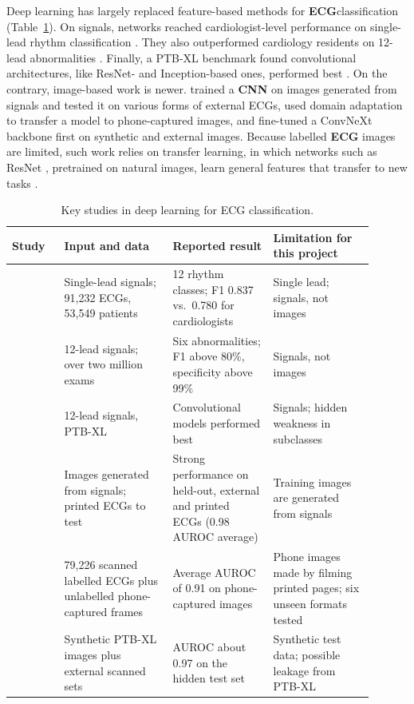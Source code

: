 Deep learning has largely replaced feature-based methods for \textbf{ECG}classification
(Table~\ref{tab:ecg-studies}). On signals, networks reached cardiologist-level performance on single-lead rhythm classification \cite{hannun_cardiologist_2019}. They also outperformed cardiology residents on 12-lead abnormalities \cite{ribeiro_automatic_2020}. Finally, a PTB-XL
benchmark found convolutional architectures, like ResNet- and Inception-based ones,
performed best \cite{strodthoff_deep_2021}. On the contrary, image-based work is newer.
\textcite{sangha_automated_2022} trained a \textbf{CNN} on images generated from signals
and tested it on various forms of external ECGs, \textcite{gliner_domain_2023} used
domain adaptation to transfer a model to phone-captured images, and
\textcite{wang_pipeline_2025} fine-tuned a ConvNeXt backbone first on synthetic and
external images. Because labelled \textbf{ECG} images are limited, such work relies on transfer
learning, in which networks such as ResNet \cite{he_deep_2016}, pretrained on natural
images, learn general features that transfer to new tasks
\cite{yosinski_transfer_2014}.

\begin{table}[ht]
  \centering
  \footnotesize
  \caption{Key studies in deep learning for ECG classification.}
  \label{tab:ecg-studies}
  \begin{tabular}{@{}p{0.13\linewidth} p{0.27\linewidth} p{0.25\linewidth} p{0.25\linewidth}@{}}
    \toprule
    \textbf{Study} & \textbf{Input and data} & \textbf{Reported result} &
      \textbf{Limitation for this project} \\
    \midrule
    \textcite{hannun_cardiologist_2019} &
      Single-lead signals; 91,232 ECGs, 53,549 patients &
      12 rhythm classes; F1 0.837 vs.\ 0.780 for cardiologists &
      Single lead; signals, not images \\
    \textcite{ribeiro_automatic_2020} &
      12-lead signals; over two million exams &
      Six abnormalities; F1 above 80\%, specificity above 99\% &
      Signals, not images \\
    \textcite{strodthoff_deep_2021} &
      12-lead signals, PTB-XL &
      Convolutional models performed best &
      Signals; hidden weakness in subclasses \\
    \textcite{sangha_automated_2022} &
      Images generated from signals; printed ECGs to test &
      Strong performance on held-out, external and printed ECGs (0.98 AUROC average) &
      Training images are generated from signals \\
    \textcite{gliner_domain_2023} &
      79,226 scanned labelled ECGs plus unlabelled phone-captured frames &
      Average AUROC of 0.91 on phone-captured images &
      Phone images made by filming printed pages; six unseen formats tested \\
    \textcite{wang_pipeline_2025} &
      Synthetic PTB-XL images plus external scanned sets &
      AUROC about 0.97 on the hidden test set &
      Synthetic test data; possible leakage from PTB-XL \\
    \bottomrule
  \end{tabular}
\end{table}

